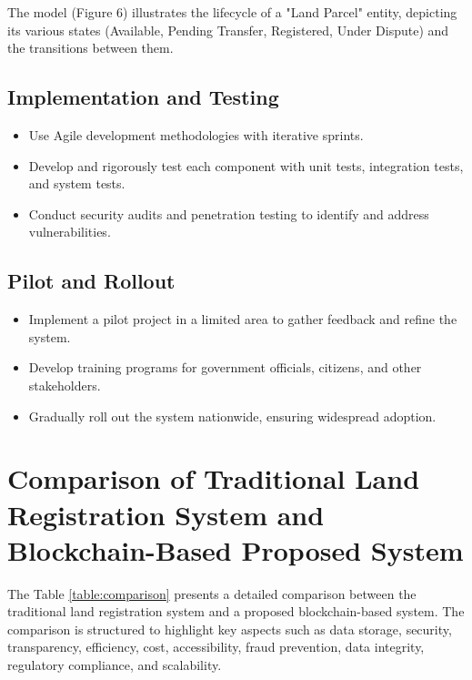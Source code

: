 \documentclass[conference]{IEEEtran}
\begin{document}
    The model (Figure 6) illustrates the lifecycle of a "Land Parcel" entity, depicting its various states (Available, Pending Transfer, Registered, Under Dispute) and the transitions between them.

\subsection{Implementation and Testing}
\begin{itemize}
    \item Use Agile development methodologies with iterative sprints.
    \item Develop and rigorously test each component with unit tests, integration tests, and system tests.
    \item Conduct security audits and penetration testing to identify and address vulnerabilities.
\end{itemize}

\subsection{Pilot and Rollout}
\begin{itemize}
    \item Implement a pilot project in a limited area to gather feedback and refine the system.
    \item Develop training programs for government officials, citizens, and other stakeholders.
    \item Gradually roll out the system nationwide, ensuring widespread adoption.
\end{itemize}

\section*{Comparison of Traditional Land Registration System and Blockchain-Based Proposed System}

The Table \ref{table:comparison} presents a detailed comparison between the traditional land registration system and a proposed blockchain-based system. The comparison is structured to highlight key aspects such as data storage, security, transparency, efficiency, cost, accessibility, fraud prevention, data integrity, regulatory compliance, and scalability.
\end{document}

